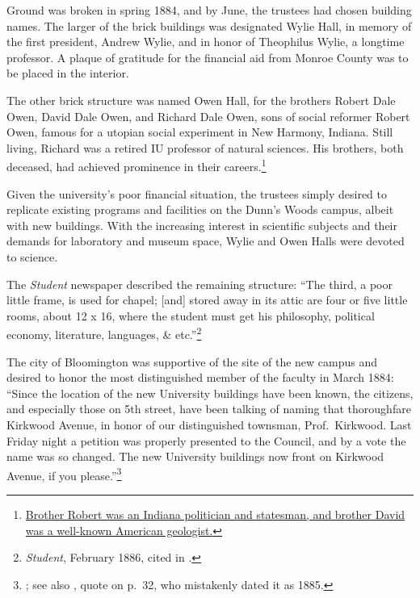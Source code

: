 \documentclass[
  american,
  letterpaper,
]{scrreprt}
\begin{document}
Ground was broken in spring 1884, and by June, the trustees had chosen
building names. The larger of the brick buildings was designated Wylie
Hall, in memory of the first president, Andrew Wylie, and in honor of
Theophilus Wylie, a longtime professor. A plaque of gratitude for the
financial aid from Monroe County was to be placed in the interior.

The other brick structure was named Owen Hall, for the brothers Robert
Dale Owen, David Dale Owen, and Richard Dale Owen, sons of social
reformer Robert Owen, famous for a utopian social experiment in New
Harmony, Indiana. Still living, Richard was a retired IU professor of
natural sciences. His brothers, both deceased, had achieved prominence
in their careers.\footnote{\href{https://purl.dlib.indiana.edu/iudl/archives/iubot/1884-06-04}{Brother
  Robert was an Indiana politician and statesman, and brother David was
  a well-known American geologist.}}

Given the university's poor financial situation, the trustees simply
desired to replicate existing programs and facilities on the Dunn's
Woods campus, albeit with new buildings. With the increasing interest in
scientific subjects and their demands for laboratory and museum space,
Wylie and Owen Halls were devoted to science.

The \emph{Student} newspaper described the remaining structure: ``The
third, a poor little frame, is used for chapel; {[}and{]} stored away in
its attic are four or five little rooms, about 12 x 16, where the
student must get his philosophy, political economy, literature,
languages, \& etc.''\footnote{\emph{Student}, February 1886, cited in
  .}

The city of Bloomington was supportive of the site of the new campus and
desired to honor the most distinguished member of the faculty in March
1884: ``Since the location of the new University buildings have been
known, the citizens, and especially those on 5th street, have been
talking of naming that thoroughfare Kirkwood Avenue, in honor of our
distinguished townsman, Prof.~Kirkwood. Last Friday night a petition was
properly presented to the Council, and by a vote the name was so
changed. The new University buildings now front on Kirkwood Avenue, if
you please.''\footnote{; see also
  , quote on p.~32, who mistakenly dated it as
  1885.}
\end{document}
